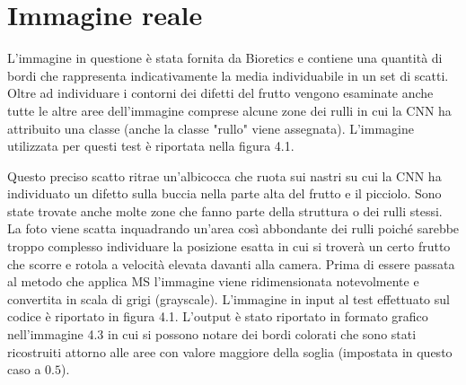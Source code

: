 \documentclass[12pt,a4paper]{report}
\begin{document}
{\section{Immagine reale}
L'immagine in questione è stata fornita da Bioretics e contiene una quantità di bordi che rappresenta indicativamente la media individuabile in un set di scatti. Oltre ad individuare i contorni dei difetti del frutto vengono esaminate anche tutte le altre aree dell'immagine comprese alcune zone dei rulli in cui la CNN ha attribuito una classe (anche la classe "rullo" viene assegnata).
L'immagine utilizzata per questi test è riportata nella figura 4.1.
\begin{figure}[H]
\centering
\begin{floatrow}[1]
\end{floatrow}
\end{figure} 
Questo preciso scatto ritrae un'albicocca che ruota sui nastri su cui la CNN ha individuato un difetto sulla buccia nella parte alta del frutto e il picciolo. Sono state trovate anche molte zone che fanno parte della struttura o dei rulli stessi. La foto viene scatta inquadrando un'area così abbondante dei rulli poiché sarebbe troppo complesso individuare la posizione esatta in cui si troverà un certo frutto che scorre e rotola a velocità elevata davanti alla camera.
\newpage
Prima di essere passata al metodo che applica MS l'immagine viene ridimensionata notevolmente e convertita in scala di grigi (grayscale). L'immagine in input al test effettuato sul codice è riportato in figura 4.1.
L'output è stato riportato in formato grafico nell'immagine 4.3 in cui si possono notare dei bordi colorati che sono stati ricostruiti attorno alle aree con valore maggiore della soglia (impostata in questo caso a $0.5$).
\begin{figure}[H]
\centering
\begin{floatrow}[1]
\end{floatrow}
\end{figure} 

}
\end{document}
